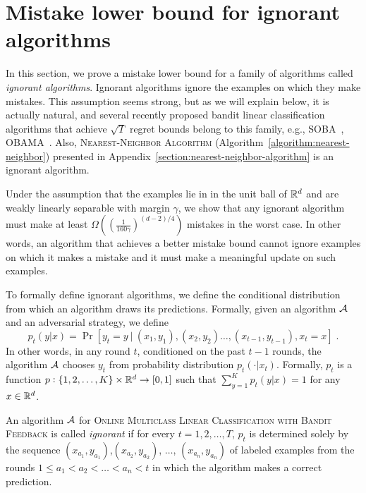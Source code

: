 \section{Mistake lower bound for ignorant algorithms}
\label{section:mistake-lower-bound-for-ignorant-algorithms}

In this section, we prove a mistake lower bound for a family of algorithms
called \textit{ignorant algorithms}. Ignorant algorithms ignore the examples on
which they make mistakes. This assumption seems strong, but as we will explain
below, it is actually natural, and several recently proposed bandit linear
classification algorithms that achieve $\sqrt{T}$ regret bounds belong to this
family, e.g., SOBA~\citep{Beygelzimer-Orabona-Zhang-2017},
OBAMA~\citep{Foster-Kale-Luo-Mohri-Sridharan-2018}. Also,
\textsc{Nearest-Neighbor Algorithm} (Algorithm~\ref{algorithm:nearest-neighbor})
presented in Appendix~\ref{section:nearest-neighbor-algorithm} is an ignorant
algorithm.

Under the assumption that the examples lie in in the unit ball of $\mathbb{R}^d$ and are
weakly linearly separable with margin $\gamma$, we show that any ignorant
algorithm must make at least $\Omega \left( \left(\frac{1}{160
\gamma}\right)^{(d-2)/4} \right)$ mistakes in the worst case. In other words, an
algorithm that achieves a better mistake bound cannot ignore examples on which
it makes a mistake and it must make a meaningful update on such examples.

To formally define ignorant algorithms, we define the conditional distribution
from which an algorithm draws its predictions. Formally, given an algorithm
$\mathcal{A}$ and an adversarial strategy, we define
\[
p_t(y|x) =
\Pr[y_t = y ~|~ (x_1, y_1), (x_2, y_2) \dots, (x_{t-1}, y_{t-1}), x_t = x] \; .
\]
In other words, in any round $t$, conditioned on the past $t-1$ rounds, the
algorithm $\mathcal{A}$ chooses $y_t$ from probability distribution $p_t(\cdot|x_t)$.
Formally, $p_t$ is a function $p:\{1,2,\dots,K\} \times \mathbb{R}^d \to [0,1]$
such that $\sum_{y=1}^K p_t(y|x) = 1$ for any $x \in \mathbb{R}^d$.

\begin{definition}
An algorithm $\mathcal{A}$ for \textsc{Online Multiclass Linear Classification with
Bandit Feedback} is called \emph{ignorant} if for every $t=1,2,\dots,T$,
$p_t$ is determined solely by the sequence
$(x_{a_1}, y_{a_1})$,$(x_{a_2}, y_{a_2})$, $\dots$, $(x_{a_n}, y_{a_n})$
of labeled examples
from the rounds $1 \le a_1 < a_2 < \dots < a_n < t$ in which
the algorithm makes a correct prediction.
\end{definition}

